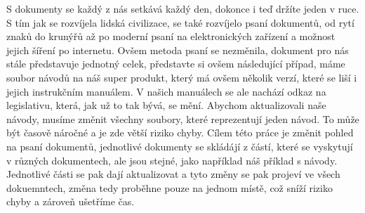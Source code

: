 S dokumenty se každý z nás setkává každý den, dokonce i teď držíte jeden v ruce. S tím jak se rozvíjela lidská civilizace,
se také rozvíjelo psaní dokumentů, od rytí znaků do krunýřů až po moderní psaní na elektronických zařízení a možnost jejich šíření po internetu.
Ovšem metoda psaní se nezměnila, dokument pro nás stále představuje jednotný celek, představte si ovšem následující případ, máme soubor návodů na náš super
produkt, který má ovšem několik verzí, které se liší i jejich instrukčním manuálem. V našich manuálech se ale nachází odkaz na legislativu, která, jak už to tak
bývá, se mění. Abychom aktualizovali naše návody, musíme změnit všechny soubory, které reprezentují jeden návod. To může být časově náročné a je zde větší riziko
chyby. Cílem této práce je změnit pohled na psaní dokumentů, jednotlivé dokumenty se skládájí z částí, které se vyskytují v různých dokumentech, ale jsou stejné,
jako například náš příklad s návody. Jednotlivé části se pak dají aktualizovat a tyto změny se pak projeví ve všech dokuemntech, změna tedy proběhne
pouze na jednom místě, což sníží riziko chyby a zároveň ušetříme čas.
